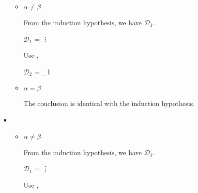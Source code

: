 \begin{itemize}
	      \begin{itemize}
	      		      		      		      		      	
	      	\item $\alpha \neq \beta$
	      	      	      	      	      	      	      	      	      	      
	      	      From the induction hypothesis, we have $\mathcal{D}_1$.
	      	      	      	      	      	      	      	      	      	      
	      	      $\mathcal{D}_1$ = 
	      	      {\vdots}
	      	      	      	      	      	      	      	      	      	      
	      	      Use \KTW,
	      	      	      	      	      	      	      	      	      	      
	      	      $\mathcal{D}_2$ = 
	      	      {_1}
	      	      	      	      	      	      	      	      	      	      
	      	\item $\alpha = \beta$
	      	      	      	      	      	      	      	      	      	      
	      	      The conclusion is identical with the induction hypothesis.
	      	      	      	      	      	      	      	      	      	      
	      \end{itemize}
	      	      	      	      	      
	\item \KTWL
	      	      	      	      	      
	      \begin{itemize}
	      		      		      		      		      	
	      	\item $\alpha \neq \beta$
	      	      	      	      	      	      	      	      	      	      
	      	      From the induction hypothesis, we have $\mathcal{D}_1$.
	      	      	      	      	      	      	      	      	      	      
	      	      $\mathcal{D}_1$ = 
	      	      {\vdots}
	      	      	      	      	      	      	      	      	      	      
	      	      Use \KTWL,
	      	      	      	      	      	      	      	      	      	      

\end{itemize}
\end{itemize}
